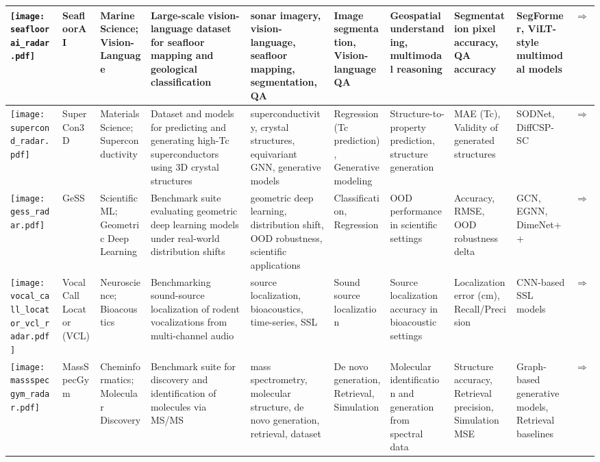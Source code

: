 \begin{landscape}
{\begin{longtable}{|p{}|p{}|p{}|p{}|p{}|p{}|p{}|p{}|p{}|p{}|}
\texttt{[image: seafloorai\_radar.pdf]} & SeafloorAI & Marine Science; Vision-Language & Large-scale vision-language dataset for seafloor mapping and geological classification & sonar imagery, vision-language, seafloor mapping, segmentation, QA & Image segmentation, Vision-language QA & Geospatial understanding, multimodal reasoning & Segmentation pixel accuracy, QA accuracy & SegFormer, ViLT-style multimodal models & \cite{nguyen2024seafloor}\href{https://neurips.cc/virtual/2024/poster/97432}{$\Rightarrow$} \\ \hline
\texttt{[image: supercond\_radar.pdf]} & SuperCon3D & Materials Science; Superconductivity & Dataset and models for predicting and generating high-Tc superconductors using 3D crystal structures & superconductivity, crystal structures, equivariant GNN, generative models & Regression (Tc prediction), Generative modeling & Structure-to-property prediction, structure generation & MAE (Tc), Validity of generated structures & SODNet, DiffCSP-SC & \cite{neurips2024_c4e3b55e}\href{https://neurips.cc/virtual/2024/poster/97553}{$\Rightarrow$} \\ \hline
\texttt{[image: gess\_radar.pdf]} & GeSS & Scientific ML; Geometric Deep Learning & Benchmark suite evaluating geometric deep learning models under real-world distribution shifts & geometric deep learning, distribution shift, OOD robustness, scientific applications & Classification, Regression & OOD performance in scientific settings & Accuracy, RMSE, OOD robustness delta & GCN, EGNN, DimeNet++ & \cite{neurips2024_a8063075}\href{https://neurips.cc/virtual/2024/poster/97816}{$\Rightarrow$} \\ \hline
\texttt{[image: vocal\_call\_locator\_vcl\_radar.pdf]} & Vocal Call Locator (VCL) & Neuroscience; Bioacoustics & Benchmarking sound-source localization of rodent vocalizations from multi-channel audio & source localization, bioacoustics, time-series, SSL & Sound source localization & Source localization accuracy in bioacoustic settings & Localization error (cm), Recall/Precision & CNN-based SSL models & \cite{neurips2024_c00d37d6}\href{https://neurips.cc/virtual/2024/poster/97470}{$\Rightarrow$} \\ \hline
\texttt{[image: massspecgym\_radar.pdf]} & MassSpecGym & Cheminformatics; Molecular Discovery & Benchmark suite for discovery and identification of molecules via MS/MS & mass spectrometry, molecular structure, de novo generation, retrieval, dataset & De novo generation, Retrieval, Simulation & Molecular identification and generation from spectral data & Structure accuracy, Retrieval precision, Simulation MSE & Graph-based generative models, Retrieval baselines & \cite{neurips2024_c6c31413}\href{https://neurips.cc/virtual/2024/poster/97823}{$\Rightarrow$} \\ \hline

\end{longtable}}
\end{landscape}
